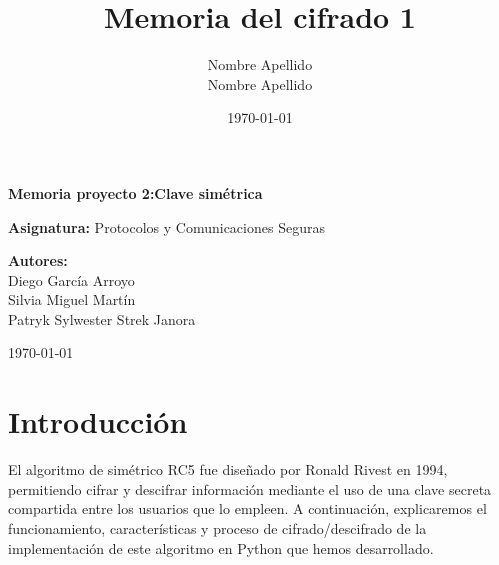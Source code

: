 \documentclass[12pt,a4paper]{article}
\title{
	\textbf{Memoria del cifrado 1}
}
\author{
	Nombre Apellido\\
	Nombre Apellido
}
\date{\today}
\begin{document}
	
	
	\begin{titlepage}
		
		\centering
		
		\vspace*{3cm}
		
		{\Huge \textbf{Memoria proyecto 2:Clave simétrica}\par}
		
		\vspace{2cm}
		
		{\Large \textbf{Asignatura: }Protocolos y Comunicaciones Seguras\par}
		
		\vspace{3cm}
		
		{\large
			\textbf{Autores:}\\[0.5cm]
			Diego García Arroyo\\
			Silvia Miguel Martín\\
			Patryk Sylwester Strek Janora\\		
			\par}
		
		\vfill
		
		{\large
			\today
			\par}
		
	\end{titlepage}
	
	
	\tableofcontents
	
	\newpage
	
	\section{Introducción}
	El algoritmo de simétrico RC5 fue diseñado por Ronald Rivest en 1994, permitiendo cifrar y descifrar información mediante el uso de una clave secreta compartida entre los usuarios que lo empleen.
	A continuación, explicaremos el funcionamiento, características y proceso de cifrado/descifrado de la implementación de este algoritmo en Python que hemos desarrollado.
	
\end{document}
